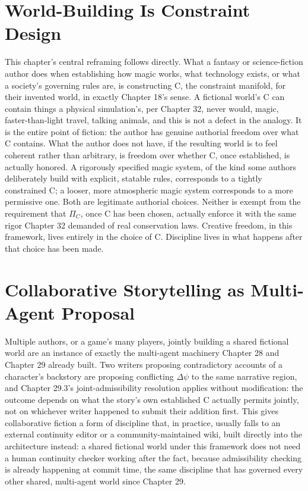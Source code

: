 \section{World-Building Is Constraint Design}

This chapter's central reframing follows directly. What a fantasy or science-fiction author does when establishing how magic works, what technology exists, or what a society's governing rules are, is constructing C, the constraint manifold, for their invented world, in exactly Chapter 18's sense. A fictional world's C can contain things a physical simulation's, per Chapter 32, never would, magic, faster-than-light travel, talking animals, and this is not a defect in the analogy. It is the entire point of fiction: the author has genuine authorial freedom over what C contains. What the author does not have, if the resulting world is to feel coherent rather than arbitrary, is freedom over whether C, once established, is actually honored. A rigorously specified magic system, of the kind some authors deliberately build with explicit, statable rules, corresponds to a tightly constrained C; a looser, more atmospheric magic system corresponds to a more permissive one. Both are legitimate authorial choices. Neither is exempt from the requirement that \(\Pi_C\), once C has been chosen, actually enforce it with the same rigor Chapter 32 demanded of real conservation laws. Creative freedom, in this framework, lives entirely in the choice of C. Discipline lives in what happens after that choice has been made.

\section{Collaborative Storytelling as Multi-Agent Proposal}

Multiple authors, or a game's many players, jointly building a shared fictional world are an instance of exactly the multi-agent machinery Chapter 28 and Chapter 29 already built. Two writers proposing contradictory accounts of a character's backstory are proposing conflicting \(\Delta\psi\) to the same narrative region, and Chapter 29.3's joint-admissibility resolution applies without modification: the outcome depends on what the story's own established C actually permits jointly, not on whichever writer happened to submit their addition first. This gives collaborative fiction a form of discipline that, in practice, usually falls to an external continuity editor or a community-maintained wiki, built directly into the architecture instead: a shared fictional world under this framework does not need a human continuity checker working after the fact, because admissibility checking is already happening at commit time, the same discipline that has governed every other shared, multi-agent world since Chapter 29.


